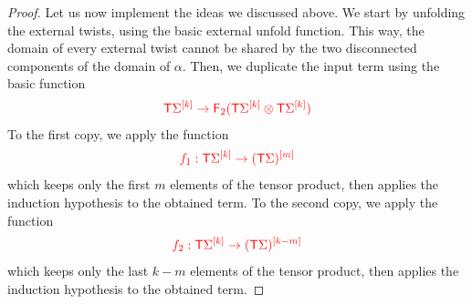 \begin{proof}
Let us now implement the ideas we discussed above. We start by unfolding the external twists, using the basic external unfold function. This way, the domain of every external twist  cannot be shared by the two disconnected components of the domain of $\alpha$.
Then, we duplicate the input term using the basic function 
\begin{align*}
\ranked{\tmonad \mati k \Sigma\to \reduce 2 (\tmonad \mati k \Sigma\otimes \tmonad \mati k \Sigma)}
\end{align*}
To the first copy, we apply the function  
\begin{align*}
\ranked{f_1:\tmonad \mati k \Sigma \to \mati m {(\tmonad \Sigma)}}
\end{align*}
which keeps only the first $m$ elements of the tensor product, then applies the induction hypothesis to the obtained term.
To the second copy, we apply the function 
\begin{align*}
\ranked{f_2:\tmonad \mati k \Sigma \to \mati {k-m} {(\tmonad \Sigma)}}
\end{align*}
which keeps only the last $k-m$ elements of the tensor product, then applies the induction hypothesis to the obtained term.


\end{proof}
